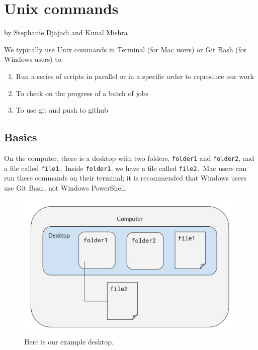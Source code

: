 \documentclass[]{book}
\providecommand{\tightlist}{%
  \setlength{\itemsep}{0pt}\setlength{\parskip}{0pt}}
\begin{document}
\hypertarget{unix}{%
\chapter{Unix commands}\label{unix}}

by Stephanie Djajadi and Kunal Mishra

We typically use Unix commands in Terminal (for Mac users) or Git Bash (for Windows users) to

\begin{enumerate}
\def\labelenumi{\arabic{enumi}.}
\tightlist
\item
  Run a series of scripts in parallel or in a specific order to reproduce our work
\item
  To check on the progress of a batch of jobs
\item
  To use git and push to github
\end{enumerate}

\hypertarget{basics-1}{%
\section{Basics}\label{basics-1}}

On the computer, there is a desktop with two folders, \texttt{folder1} and \texttt{folder2}, and a file called \texttt{file1.} Inside \texttt{folder1}, we have a file called \texttt{file2.} Mac users can run these commands on their terminal; it is recommended that Windows users use Git Bash, not Windows PowerShell.

\begin{figure}
\centering
\includegraphics{assets/images/ex-desktop.jpg}
\caption{Here is our example desktop.}
\end{figure}
\end{document}

